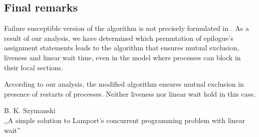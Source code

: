 \subsection*{Final remarks}

Failure susceptible version of the algorithm is not precisely formulated in \cite{Original}.
As a result of our analysis, we have determined which permutation of epilogue's assignment statements leads to the algorithm that ensures mutual exclusion, liveness and linear wait time, even in the model where processes can block in their local sections.

According to our analysis, the modified algorithm ensures mutual exclusion in presence of restarts of processes.
Neither liveness nor linear wait hold in this case.


\begin{thebibliography}{9}
   B. K. Szymanski \\
    \newblock ,,A simple solution to Lamport's concurrent programming problem with linear wait''
\end{thebibliography}


